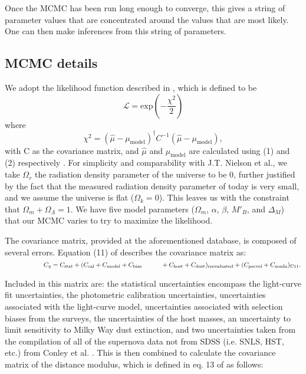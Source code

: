 \documentclass[aps,prl,reprint]{revtex4-1}
\begin{document}
Once the MCMC has been run long enough to converge, this gives a string of parameter values that are concentrated around the values that are most likely. One can then make inferences from this string of parameters. 

\subsection{MCMC details}

\par We adopt the likelihood function described in \cite{sdss}, which is defined to be $$\mathscr{L} = \text{exp}(-\frac{\chi^2}{2}) $$ where$$\chi^2 = (\hat{\mu}-\mu_\text{model})^\dagger C^{-1} (\hat{\mu}-\mu_\text{model}),$$  with C as the covariance matrix, and $\hat{\mu}$ and $\mu_\text{model}$ are calculated using (1) and (2) respectively . For simplicity and comparability with J.T. Nielson et al., we take $\Omega_r$ the radiation density parameter of the universe to be 0, further justified by the fact that the measured radiation density parameter of today is very small, and we assume the universe is flat ($\Omega_k = 0$). This leaves us with the constraint that $\Omega_m + \Omega_{\Lambda} = 1 $. We have five model parameters ($\Omega_m$, $\alpha$, $\beta$, $M'_B$, and $\Delta_M$) that our MCMC varies to try to maximize the likelihood.
\par The covariance matrix, provided at the aforementioned database, is composed of several errors. Equation (11) of \cite{sdss} describes the covariance matrix as: \begin{math}  \newline \newline  \indent \indent \indent \indent  C_\eta = C_{\text{stat}} + (C_{\text{cal}} + C_{\text{model}} + C_{\text{bias}} \newline
\indent \indent  + C_{\text{host}} + C_{\text{dust}})_{\text{reevaluated}} + (C_{\text{pecvel}}+C_{\text{nonIa}})_{\text{C11}}.\end{math}
\newline \par Included in this matrix are: the statistical uncertainties encompass the light-curve fit uncertainties, the photometric calibration uncertainties, uncertainties associated with the light-curve model, uncertainties associated with selection biases from the surveys, the uncertainties of the host masses, an uncertainty to limit sensitivity to Milky Way dust extinction, and two uncertainties taken from the compilation of all of the supernova data not from SDSS (i.e. SNLS, HST, etc.) from Conley et al. \cite{c11}. This is then combined to calculate the covariance matrix of the distance modulus, which is defined in eq. 13 of \cite{sdss} as follows:
\end{document}
